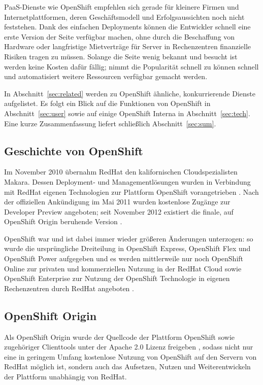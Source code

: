 \documentclass[10pt,a4paper,compsoc]{IEEEtran}
\begin{document}
PaaS-Dienste wie OpenShift empfehlen sich gerade für kleinere Firmen und Internetplattformen, deren Geschäftsmodell und Erfolgsaussichten noch nicht feststehen. Dank des einfachen Deployments können die Entwickler schnell eine erste Version der Seite verfügbar machen, ohne durch die Beschaffung von Hardware oder langfristige Mietverträge für Server in Rechenzentren finanzielle Risiken tragen zu müssen. Solange die Seite wenig bekannt und besucht ist werden keine Kosten dafür fällig; nimmt die Popularität schnell zu können schnell und automatisiert weitere Ressourcen verfügbar gemacht werden.

In Abschnitt~\ref{sec:related} werden zu OpenShift ähnliche, konkurrierende Dienste aufgelistet. Es folgt ein Blick auf die Funktionen von OpenShift in Abschnitt~\ref{sec:user} sowie auf einige OpenShift Interna in Abschnitt~\ref{sec:tech}. Eine kurze Zusammenfassung liefert schließlich Abschnitt~\ref{sec:sum}.

\subsection{Geschichte von OpenShift}
Im November 2010 übernahm RedHat den kalifornischen Cloudspezialisten Makara. Dessen Deployment- und Managementlösungen wurden in Verbindung mit RedHat eigenen Technologien zur Plattform OpenShift vorangetrieben \cite{openshift_primer}. Nach der offiziellen Ankündigung im Mai 2011 wurden kostenlose Zugänge zur Developer Preview angeboten; seit November 2012 existiert die finale, auf OpenShift Origin beruhende Version \cite{os_enterprise}.

OpenShift war und ist dabei immer wieder größeren Änderungen unterzogen: so wurde die ursprüngliche Dreiteilung in OpenShift Express, OpenShift Flex und OpenShift Power aufgegeben und es werden mittlerweile nur noch OpenShift Online zur privaten und kommerziellen Nutzung in der RedHat Cloud sowie OpenShift Enterprise zur Nutzung der OpenShift Technologie in eigenen Rechenzentren durch RedHat angeboten \cite{cloud_kueche}.

\subsection{OpenShift Origin}
Als OpenShift Origin wurde der Quellcode der Plattform OpenShift sowie zugehöriger Clienttools unter der Apache 2.0 Lizenz freigeben \cite{os_code}\cite{apache_lic}, sodass nicht nur eine in geringem Umfang kostenlose Nutzung von OpenShift auf den Servern von RedHat möglich ist, sondern auch das Aufsetzen, Nutzen und Weiterentwickeln der Plattform unabhängig von RedHat.
\end{document}
